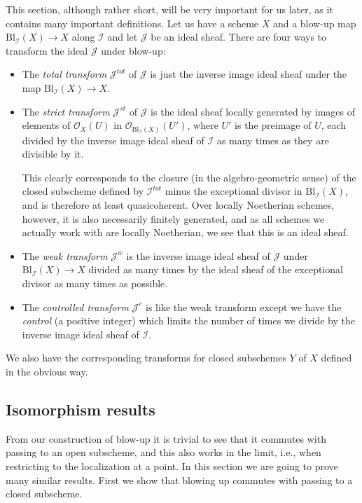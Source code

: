\documentclass[12pt,a4paper,leqno]{article}
\newcommand{\OO}{\mathcal{O}}
\newcommand{\bl}{\mathrm{Bl}}
\theoremstyle{plain}
\theoremstyle{definition}
\theoremstyle{remark}
\begin{document}
This section, although rather short, will be very important for us later, as it contains many important definitions. Let us have a scheme $X$ and a blow-up map $\bl_{\mathscr{I}}(X) \to X$ along $\mathscr{I}$ and let $\mathscr{J}$ be an ideal sheaf. There are four ways to transform the ideal $\mathscr{J}$ under blow-up:

\begin{itemize}
\item The \emph{total transform} $\mathscr{J}^{tot}$ of $\mathscr{J}$ is just the inverse image ideal sheaf under the map $\bl_{\mathscr{I}}(X) \to X$.

\item The \emph{strict transform} $\mathscr{J}^{st}$ of $\mathscr{J}$ is the ideal sheaf locally generated by images of elements of $\OO_X (U)$ in $\OO_{\bl_{\mathscr{I}}(X)}(U')$, where $U'$ is the preimage of $U$, each divided by the inverse image ideal sheaf of $\mathscr{I}$ as many times as they are divisible by it.

This clearly corresponds to the closure (in the algebro-geometric sense) of the closed subscheme defined by $\mathscr{I}^{tot}$ minus the exceptional divisor in $\bl_{\mathscr{I}} (X)$, and is therefore at least quasicoherent. Over locally Noetherian schemes, however, it is also necessarily finitely generated, and as all schemes we actually work with are locally Noetherian, we see that this is an ideal sheaf.

\item The \emph{weak transform} $\mathscr{J}^{w}$ is the inverse image ideal sheaf of $\mathscr{J}$ under $\bl_{\mathscr{I}}(X) \to X$ divided as many times by the ideal sheaf of the exceptional divisor as many times as possible.

\item The \emph{controlled transform} $\mathscr{J}^{c}$ is like the weak transform except we have the \emph{control} (a positive integer) which limits the number of times we divide by the inverse image ideal sheaf of $\mathscr{I}$.
\end{itemize}

We also have the corresponding transforms for closed subschemes $Y$ of $X$ defined in the obvious way.

\subsection{Isomorphism results}

From our construction of blow-up it is trivial to see that it commutes with passing to an open subscheme, and this also works in the limit, i.e., when restricting to the localization at a point. In this section we are going to prove many similar results. First we show that blowing up commutes with passing to a closed subscheme.
\end{document}
